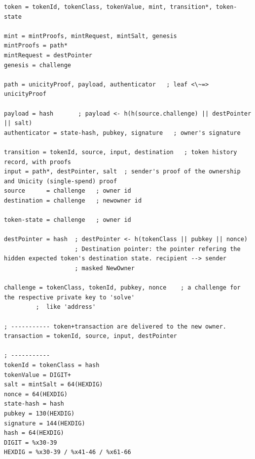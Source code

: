 \documentclass{article}
\begin{document}
\begin{lstlisting}[language=abnf]
token = tokenId, tokenClass, tokenValue, mint, transition*, token-state

mint = mintProofs, mintRequest, mintSalt, genesis
mintProofs = path*
mintRequest = destPointer
genesis = challenge

path = unicityProof, payload, authenticator   ; leaf <\~=> unicityProof

payload = hash       ; payload <- h(h(source.challenge) || destPointer || salt)
authenticator = state-hash, pubkey, signature   ; owner's signature

transition = tokenId, source, input, destination   ; token history record, with proofs
input = path*, destPointer, salt  ; sender's proof of the ownership and Unicity (single-spend) proof
source      = challenge   ; owner id
destination = challenge   ; newowner id

token-state = challenge   ; owner id

destPointer = hash  ; destPointer <- h(tokenClass || pubkey || nonce)
                    ; Destination pointer: the pointer refering the hidden expected token's destination state. recipient --> sender
                    ; masked NewOwner

challenge = tokenClass, tokenId, pubkey, nonce    ; a challenge for the respective private key to 'solve'
         ;  like 'address'

; ----------- token+transaction are delivered to the new owner.
transaction = tokenId, source, input, destPointer

; -----------
tokenId = tokenClass = hash
tokenValue = DIGIT+
salt = mintSalt = 64(HEXDIG)
nonce = 64(HEXDIG)
state-hash = hash
pubkey = 130(HEXDIG)
signature = 144(HEXDIG)
hash = 64(HEXDIG)
DIGIT = %x30-39
HEXDIG = %x30-39 / %x41-46 / %x61-66
\end{lstlisting}
\end{document}
